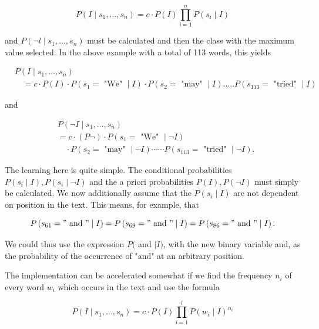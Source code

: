 \documentclass[10pt]{book}
\begin{document}
\begin{equation*}
P\left(I \mid s_{1}, \ldots, s_{n}\right)=c \cdot P(I) \prod_{i=1}^{n} P\left(s_{i} \mid I\right) \tag{8.9}
\end{equation*}


and $P\left(\neg l \mid s_{1}, \ldots, s_{n}\right)$ must be calculated and then the class with the maximum value selected. In the above example with a total of 113 words, this yields

$$
\begin{aligned}
& P\left(I \mid s_{1}, \ldots, s_{n}\right) \\
& \quad=c \cdot P(I) \cdot P\left(s_{1}=\text { "We" } \mid I\right) \cdot P\left(s_{2}=\text { "may" } \mid I\right) \ldots . . P\left(s_{113}=\text { "tried" } \mid I\right)
\end{aligned}
$$

and

$$
\begin{aligned}
& P\left(\neg I \mid s_{1}, \ldots, s_{n}\right) \\
& =c \cdot(P \neg) \cdot P\left(s_{1}=\text { "We" } \mid \neg I\right) \\
& \quad \cdot P\left(s_{2}=\text { "may" } \mid \neg I\right) \cdots \cdots P\left(s_{113}=\text { "tried" } \mid \neg I\right) .
\end{aligned}
$$

The learning here is quite simple. The conditional probabilities $P\left(s_{i} \mid I\right), P\left(s_{i} \mid \neg I\right)$ and the a priori probabilities $P(I), P(\neg I)$ must simply be calculated. We now additionally assume that the $P\left(s_{i} \mid I\right)$ are not dependent on position in the text. This means, for example, that

$$
P\left(s_{61}=" \text { and } " \mid I\right)=P\left(s_{69}=" \text { and } " \mid I\right)=P\left(s_{86}=" \text { and } " \mid I\right) .
$$

We could thus use the expression $P($ and $\mid I)$, with the new binary variable and, as the probability of the occurrence of "and" at an arbitrary position.

The implementation can be accelerated somewhat if we find the frequency $n_{i}$ of every word $w_{i}$ which occurs in the text and use the formula


\begin{equation*}
P\left(I \mid s_{1}, \ldots, s_{n}\right)=c \cdot P(I) \prod_{i=1}^{l} P\left(w_{i} \mid I\right)^{n_{i}} \tag{8.10}
\end{equation*}
\end{document}
